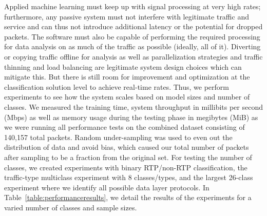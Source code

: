 Applied machine learning must keep up with signal processing at very high rates; furthermore, any passive system must not interfere with legitimate traffic and service and can thus not introduce additional latency or the potential for dropped packets. The software must also be capable of performing the required processing for data analysis on as much of the traffic as possible (ideally, all of it). Diverting or copying traffic offline for analysis as well as parallelization strategies and traffic thinning and load balancing are legitimate system design choices which can mitigate this. But there is still room for improvement and optimization at the classification solution level to achieve real-time rates. Thus, we perform experiments to see how the system scales based on model sizes and number of classes. We measured the training time, system throughput in millibits per second (Mbps) as well as memory usage during the testing phase in megibytes (MiB) as we were running all performance tests on the combined dataset consisting of 140,157 total packets. Random under-sampling was used to even out the distribution of data and avoid bias, which caused our total number of packets after sampling to be a fraction from the original set. For testing the number of classes, we created experiments with binary RTP/non-RTP classification, the traffic-type multiclass experiment with 8 classes/types, and the largest 26-class experiment where we identify all possible data layer protocols. In Table~\ref{table:performanceresults}, we detail the results of the experiments for a varied number of classes and sample sizes.

